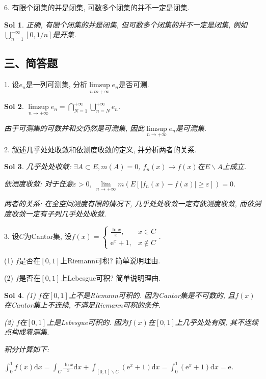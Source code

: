 \documentclass[UTF8]{article}
\newtheorem{solution}{Sol}
\begin{document}
  6. 有限个闭集的并是闭集, 可数多个闭集的并不一定是闭集.\par

  \begin{solution}
    正确, 有限个闭集的并是闭集, 但可数多个闭集的并不一定是闭集, 例如$\bigcup_{n=1}^{+\infty}[0,1/n]$是开集.\par
  \end{solution}

  \subsection*{三、简答题}

  1. 设$e_n$是一列可测集, 分析$\limsup \limits_{n \ to +\infty}e_n$是否可测.\par

  \begin{solution}
    $\limsup \limits_{n \to +\infty}e_n = \bigcap_{N=1}^{+\infty}\bigcup_{n=N}^{+\infty}e_n$.\par
    由于可测集的可数并和交仍然是可测集, 因此$\limsup \limits_{n \to +\infty}e_n$是可测集.\par
  \end{solution}

  2. 叙述几乎处处收敛和依测度收敛的定义, 并分析两者的关系.\par

  \begin{solution}
    几乎处处收敛: $\exists A\subset E, m(A)=0$, $f_n(x) \to f(x)$在$E\backslash A$上成立.\par
    依测度收敛: 对于任意$\varepsilon >0$, $\lim \limits_{n \to +\infty}m(E\left[|f_n(x)-f(x)|\geqslant \varepsilon\right])=0$.\par
    两者的关系: 在全空间测度有限的情况下, 几乎处处收敛一定有依测度收敛, 而依测度收敛一定有子列几乎处处收敛.\par
  \end{solution}

  3. 设$C$为Cantor集, 设$f(x)=\begin{cases}
    \frac{\ln x}{x}, & x\in C \\
    \mathrm{e}^x+1, & x\notin C
  \end{cases}$.\par
  (1) $f$是否在$[0,1]$上Riemann可积? 简单说明理由.\par
  (2) $f$是否在$[0,1]$上Lebesgue可积? 简单说明理由.\par

  \begin{solution}
    (1) $f$在$[0,1]$上不是Riemann可积的. 因为Cantor集是不可数的, 且$f(x)$在Cantor集上不连续, 不满足Riemann可积的条件.\par
    (2) $f$在$[0,1]$上是Lebesgue可积的. 因为$f(x)$在$[0,1]$上几乎处处有限, 其不连续点构成零测集.\par
    积分计算如下:\par
    $\int_{0}^{1}f(x)\mathrm{d}x=\int_{C}\frac{\ln x}{x}\mathrm{d}x+\int_{[0,1]\backslash C}(\mathrm{e}^x+1)\mathrm{d}x=\int_{0}^{1}(\mathrm{e}^x+1)\mathrm{d}x = \mathrm{e}$.\par
  \end{solution}
\end{document}
